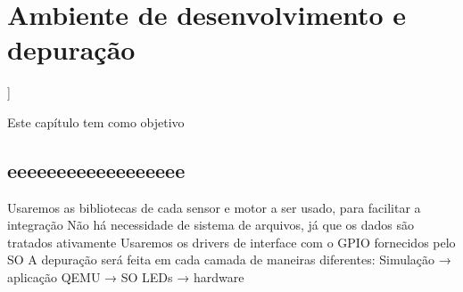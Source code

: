 \chapter{Ambiente de desenvolvimento e depuração}]

\label{CAP7}


Este capítulo tem como objetivo 


\section{eeeeeeeeeeeeeeeeee}\label{Sub:equa}

Usaremos as bibliotecas de cada sensor e motor a ser usado, para facilitar a integração
Não há necessidade de sistema de arquivos, já que os dados são tratados ativamente
Usaremos os drivers de interface com o GPIO fornecidos pelo SO
A depuração será feita em cada camada de maneiras diferentes: 
Simulação → aplicação 
QEMU → SO 
LEDs → hardware 
